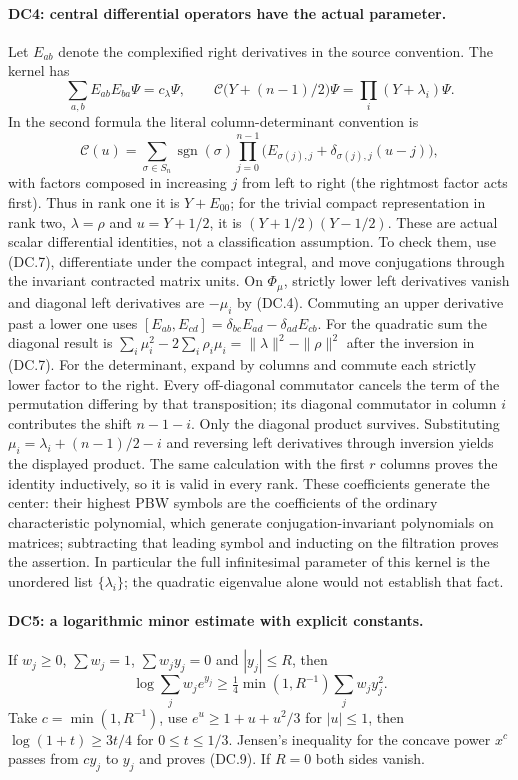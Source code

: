 \paragraph{DC4: central differential operators have the actual parameter.}
\label{claim:DC4}
Let $E_{ab}$ denote the complexified right derivatives in the source
convention.  The kernel has
\[
 \sum_{a,b}E_{ab}E_{ba}\Psi=c_\lambda\Psi,\qquad
 \mathcal C\bigl(Y+(n-1)/2\bigr)\Psi
       =\prod_i(Y+\lambda_i)\Psi.                              \tag{DC.8}
\]
In the second formula the literal column-determinant convention is
\[
 \mathcal C(u)=\sum_{\sigma\in S_n}\operatorname{sgn}(\sigma)
   \prod_{j=0}^{n-1}\bigl(E_{\sigma(j),j}
                      +\delta_{\sigma(j),j}(u-j)\bigr),
\]
with factors composed in increasing $j$ from left to right (the
rightmost factor acts first).  Thus in rank one it is $Y+E_{00}$;
for the trivial compact representation in rank two, $\lambda=\rho$
and $u=Y+1/2$, it is $(Y+1/2)(Y-1/2)$.
These are actual scalar differential identities, not a classification
assumption.  To check them, use (DC.7), differentiate under the compact
integral, and move conjugations through the invariant contracted matrix
units.  On $\Phi_\mu$, strictly lower left derivatives vanish and diagonal
left derivatives are $-\mu_i$ by (DC.4).  Commuting an upper derivative
past a lower one uses
$[E_{ab},E_{cd}]=\delta_{bc}E_{ad}-\delta_{ad}E_{cb}$.
For the quadratic sum the diagonal result is
$\sum_i\mu_i^2-2\sum_i\rho_i\mu_i
=\|\lambda\|^2-\|\rho\|^2$ after the inversion in (DC.7).
For the determinant, expand by columns and commute each strictly lower
factor to the right.  Every off-diagonal commutator cancels the term of
the permutation differing by that transposition; its diagonal commutator
in column $i$ contributes the shift $n-1-i$.  Only the diagonal product
survives.  Substituting $\mu_i=\lambda_i+(n-1)/2-i$ and reversing left
derivatives through inversion yields the displayed product.  The same
calculation with the first $r$ columns proves the identity inductively,
so it is valid in every rank.  These coefficients generate the center:
their highest PBW symbols are the coefficients of the ordinary
characteristic polynomial, which generate conjugation-invariant
polynomials on matrices; subtracting that leading symbol and inducting
on the filtration proves the assertion.  In particular the full infinitesimal
parameter of this kernel is the unordered list $\{\lambda_i\}$; the
quadratic eigenvalue alone would not establish that fact.

\paragraph{DC5: a logarithmic minor estimate with explicit constants.}
\label{claim:DC5}
If $w_j\ge0$, $\sum w_j=1$, $\sum w_jy_j=0$ and $|y_j|\le R$, then
\[
 \log\sum_jw_je^{y_j}\ge
       \tfrac14\min(1,R^{-1})\sum_jw_jy_j^2.                   \tag{DC.9}
\]
Take $c=\min(1,R^{-1})$, use $e^u\ge1+u+u^2/3$ for $|u|\le1$,
then $\log(1+t)\ge3t/4$ for $0\le t\le1/3$.  Jensen's inequality
for the concave power $x^c$ passes from $cy_j$ to $y_j$ and proves
(DC.9).  If $R=0$ both sides vanish.

